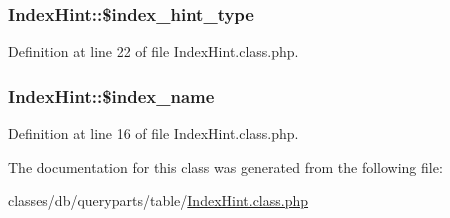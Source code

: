 \subsubsection[{\texorpdfstring{\$index\+\_\+hint\+\_\+type}{$index_hint_type}}]{\setlength{\rightskip}{0pt plus 5cm}Index\+Hint\+::\$index\+\_\+hint\+\_\+type}\hypertarget{classIndexHint_a04d23166dfd4b7490a69b678e2826a32}{}\label{classIndexHint_a04d23166dfd4b7490a69b678e2826a32}


Definition at line 22 of file Index\+Hint.\+class.\+php.

\subsubsection[{\texorpdfstring{\$index\+\_\+name}{$index_name}}]{\setlength{\rightskip}{0pt plus 5cm}Index\+Hint\+::\$index\+\_\+name}\hypertarget{classIndexHint_a72e2ec1c8ae97c974642bf4342febc60}{}\label{classIndexHint_a72e2ec1c8ae97c974642bf4342febc60}


Definition at line 16 of file Index\+Hint.\+class.\+php.



The documentation for this class was generated from the following file\+:\begin{DoxyCompactItemize}
\item 
classes/db/queryparts/table/\hyperlink{IndexHint_8class_8php}{Index\+Hint.\+class.\+php}\end{DoxyCompactItemize}

